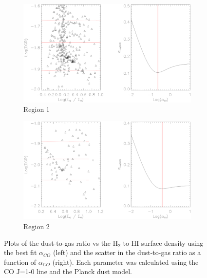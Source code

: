 \begin{figure}\label{fig:dgr_co10}
  \begin{subfigure}[t]{1\textwidth}
    \centering
    \includegraphics[width=1.\textwidth]{dgr_imgs/region_1_aco_output_10.eps}
    \caption{Region 1}
  \end{subfigure}

  \begin{subfigure}[t]{1\textwidth}
    \centering
    \includegraphics[width=1.\textwidth]{dgr_imgs/region_2_aco_output_10.eps}
    \caption{Region 2}
  \end{subfigure}
   \caption[Dust-to-Gas Ratio Determination Plots for CO J=1-0]{Plots of the dust-to-gas ratio vs the H$_2$ to HI surface density using the best fit $\alpha_{CO}$ (left) and the scatter in the dust-to-gas ratio as a function of $\alpha_{CO}$ (right).  Each parameter was calculated using the CO J=1-0 line and the Planck dust model.}
   \label{fig:dgr_co10}
\end{figure}

